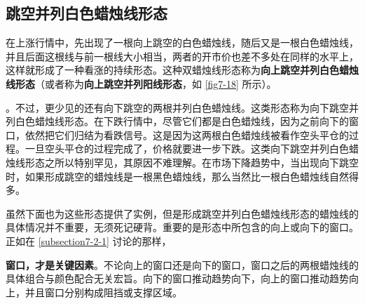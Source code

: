 \subsection{跳空并列白色蜡烛线形态}
在上涨行情中，先出现了一根向上跳空的白色蜡烛线，随后又是一根白色蜡烛线，并且后面这根线与前一根线大小相当，两者的开市价也差不多处在同样的水平上，这样就形成了一种看涨的持续形态。这种双蜡烛线形态称为\textbf{向上跳空并列白色蜡烛线形态}（或者称为\textbf{向上跳空并列阳线形态}，如 \autoref{fig7-18} 所示）。

。不过，更少见的还有向下跳空的两根并列白色蜡烛线。这类形态称为向下跳空并列白色蜡烛线形态。在下跌行情中，尽管它们都是白色蜡烛线，因为之前向下的窗口，依然把它们归结为看跌信号。这是因为这两根白色蜡烛线被看作空头平仓的过程。一旦空头平仓的过程完成了，价格就要进一步下跌。这类向下跳空并列白色蜡烛线形态之所以特别罕见，其原因不难理解。在市场下降趋势中，当出现向下跳空时，如果形成跳空的蜡烛线是一根黑色蜡烛线，那么当然比一根白色蜡烛线自然得多。


虽然下面也为这些形态提供了实例，但是形成跳空并列白色蜡烛线形态的蜡烛线的具体情况并不重要，无须死记硬背。重要的是形态中所包含的向上或向下的窗口。正如在 \autoref{subsection7-2-1}  讨论的那样，

\textbf{窗口，才是关键因素}。不论向上的窗口还是向下的窗口，窗口之后的两根蜡烛线的具体组合与颜色配合无关宏旨。向下的窗口推动趋势向下，向上的窗口推动趋势向上，并且窗口分别构成阻挡或支撑区域。